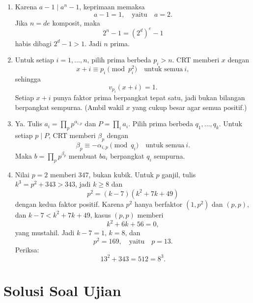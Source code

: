 \documentclass[12pt]{scrartcl}
\begin{document}
\begin{enumerate}[resume]
	\item Karena $a - 1 \mid a^n - 1$, keprimaan memaksa
	\[ a - 1 = 1, \quad \text{yaitu} \quad a = 2. \]
	Jika $n = de$ komposit, maka
	\[ 2^n - 1 = (2^d)^e - 1 \]
	habis dibagi $2^d - 1 > 1$.
	Jadi $n$ prima.

	\item Untuk setiap $i = 1, \ldots, n$, pilih prima berbeda $p_i > n$.
	CRT memberi $x$ dengan
	\[ x + i \equiv p_i \pmod{p_i^2} \quad \text{untuk semua} \ i, \]
	sehingga
	\[ v_{p_i}(x + i) = 1. \]
	Setiap $x + i$ punya faktor prima berpangkat tepat satu,
	jadi bukan bilangan berpangkat sempurna.
	(Ambil wakil $x$ yang cukup besar agar semua positif.)

	\item Ya. Tulis $a_i = \prod_p p^{\alpha_{i,p}}$ dan $P = \prod_i a_i$.
	Pilih prima berbeda $q_1, \ldots, q_k$.
	Untuk setiap $p \mid P$, CRT memberi $\beta_p$ dengan
	\[ \beta_p \equiv -\alpha_{i,p} \pmod{q_i} \quad \text{untuk semua} \ i. \]
	Maka $b = \prod_p p^{\beta_p}$ membuat $ba_i$ berpangkat $q_i$ sempurna.

	\item Nilai $p = 2$ memberi $347$, bukan kubik.
	Untuk $p$ ganjil, tulis $k^3 = p^2 + 343 > 343$, jadi $k \ge 8$ dan
	\[ p^2 = (k - 7)(k^2 + 7k + 49) \]
	dengan kedua faktor positif.
	Karena $p^2$ hanya berfaktor $(1, p^2)$ dan $(p, p)$,
	dan $k - 7 < k^2 + 7k + 49$,
	kasus $(p, p)$ memberi
	\[ k^2 + 6k + 56 = 0, \]
	yang mustahil.
	Jadi $k - 7 = 1$, $k = 8$, dan
	\[ p^2 = 169, \quad \text{yaitu} \quad p = 13. \]
	Periksa:
	\[ 13^2 + 343 = 512 = 8^3. \]
\end{enumerate}

\section{Solusi Soal Ujian}
\end{document}
